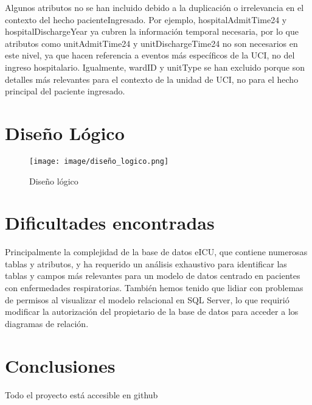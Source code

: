 \documentclass[12pt, a4paper, twoside]{article}
\begin{document}
	Algunos atributos no se han incluido debido a la duplicación o irrelevancia en el contexto del hecho pacienteIngresado. Por ejemplo, hospitalAdmitTime24 y hospitalDischargeYear ya cubren la información temporal necesaria, por lo que atributos como unitAdmitTime24 y unitDischargeTime24 no son necesarios en este nivel, ya que hacen referencia a eventos más específicos de la UCI, no del ingreso hospitalario. Igualmente, wardID y unitType se han excluido porque son detalles más relevantes para el contexto de la unidad de UCI, no para el hecho principal del paciente ingresado.  \cite{eICU2024}
	
	
	\section{Diseño Lógico}
	
	\begin{figure}[h!]
		\centering
		\texttt{[image: image/diseño\_logico.png]}
		\caption{Diseño lógico}
		\label{fig:11}
	\end{figure}
	
	\section{Dificultades encontradas}
	
	Principalmente la complejidad de la base de datos eICU, que contiene numerosas tablas y atributos, y ha requerido un análisis exhaustivo para identificar las tablas y campos más relevantes para un modelo de datos centrado en pacientes con enfermedades respiratorias. También hemos tenido que lidiar con problemas de permisos al visualizar el modelo relacional en SQL Server, lo que requirió modificar la autorización del propietario de la base de datos para acceder a los diagramas de relación.
	
	\section{Conclusiones}

	Todo el proyecto está accesible en github \cite{depab2024}
	\printbibliography
	
	
	
	
\end{document}
